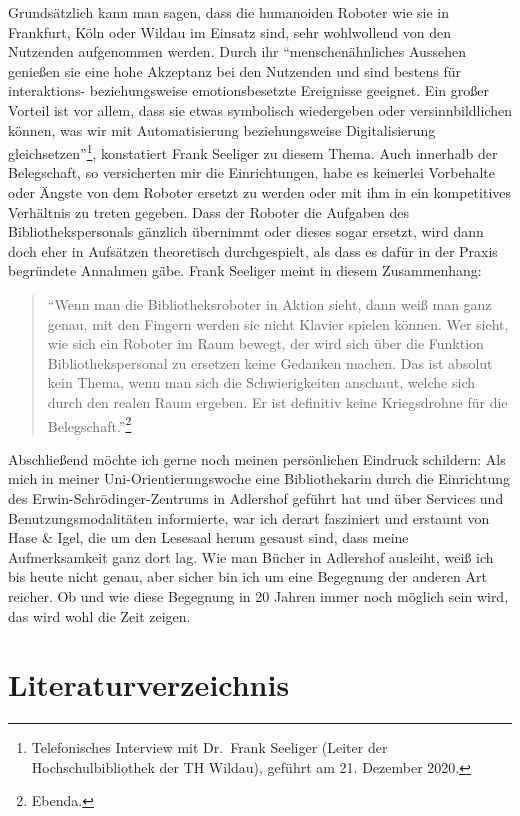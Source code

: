 \documentclass[a4paper,
fontsize=11pt,
oneside,
numbers=noperiodatend,
parskip=half-,
bibliography=totoc,
final
]{scrartcl}
\begin{document}
Grundsätzlich kann man sagen, dass die humanoiden Roboter wie sie in
Frankfurt, Köln oder Wildau im Einsatz sind, sehr wohlwollend von den
Nutzenden aufgenommen werden. Durch ihr \enquote{menschenähnliches
Aussehen genießen sie eine hohe Akzeptanz bei den Nutzenden und sind
bestens für interaktions- beziehungsweise emotionsbesetzte Ereignisse
geeignet. Ein großer Vorteil ist vor allem, dass sie etwas symbolisch
wiedergeben oder versinnbildlichen können, was wir mit Automatisierung
beziehungsweise Digitalisierung gleichsetzen}\footnote{Telefonisches
  Interview mit Dr.~Frank Seeliger (Leiter der Hochschulbibliothek der
  TH Wildau), geführt am 21. Dezember 2020.}, konstatiert Frank Seeliger
zu diesem Thema. Auch innerhalb der Belegschaft, so versicherten mir die
Einrichtungen, habe es keinerlei Vorbehalte oder Ängste von dem Roboter
ersetzt zu werden oder mit ihm in ein kompetitives Verhältnis zu treten
gegeben. Dass der Roboter die Aufgaben des Bibliothekspersonals gänzlich
übernimmt oder dieses sogar ersetzt, wird dann doch eher in Aufsätzen
theoretisch durchgespielt, als dass es dafür in der Praxis begründete
Annahmen gäbe. Frank Seeliger meint in diesem Zusammenhang:

\begin{quote}
\enquote{Wenn man die Bibliotheksroboter in Aktion sieht, dann weiß man
ganz genau, mit den Fingern werden sie nicht Klavier spielen können. Wer
sieht, wie sich ein Roboter im Raum bewegt, der wird sich über die
Funktion Bibliothekspersonal zu ersetzen keine Gedanken machen. Das ist
absolut kein Thema, wenn man sich die Schwierigkeiten anschaut, welche
sich durch den realen Raum ergeben. Er ist definitiv keine Kriegsdrohne
für die Belegschaft.}\footnote{Ebenda.}
\end{quote}

Abschließend möchte ich gerne noch meinen persönlichen Eindruck
schildern: Als mich in meiner Uni-Orientierungswoche eine Bibliothekarin
durch die Einrichtung des Erwin-Schrödinger-Zentrums in Adlershof
geführt hat und über Services und Benutzungsmodalitäten informierte, war
ich derart fasziniert und erstaunt von Hase \& Igel, die um den Lesesaal
herum gesaust sind, dass meine Aufmerksamkeit ganz dort lag. Wie man
Bücher in Adlershof ausleiht, weiß ich bis heute nicht genau, aber
sicher bin ich um eine Begegnung der anderen Art reicher. Ob und wie
diese Begegnung in 20 Jahren immer noch möglich sein wird, das wird wohl
die Zeit zeigen.

\hypertarget{literaturverzeichnis}{%
\section{Literaturverzeichnis}\label{literaturverzeichnis}}
\end{document}
